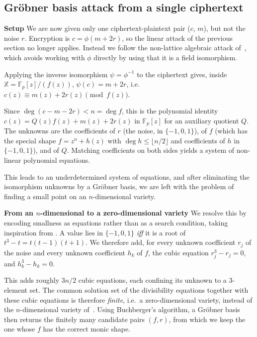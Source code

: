 \documentclass{article}
\begin{document}
\subsection{Gröbner basis attack from a single ciphertext}
\textbf{Setup}
We are now given only one ciphertext-plaintext pair ($c$, $m$), but not the noise $r$. Encryption is $c = \phi(m + 2r)$, so the linear attack of the previous section no longer applies. Instead we follow the non-lattice algebraic attack of~\textcite[\S2.4.2]{doroz2017}, which avoids working with $\phi$ directly
by using that it is a field isomorphism.

Applying the inverse isomorphism $\psi = \phi^{-1}$ to the ciphertext gives, inside $\mathbb{X} = \mathbb{F}_p[z]/(f(z))$, $\psi(c) = m + 2r$, i.e. $c(z) \equiv m(z) + 2r(z) \pmod{f(z)}$.

Since $\deg(c - m - 2r) < n = \deg f$, this is the polynomial identity $c(z) = Q(z)f(z) + m(z) + 2r(z)$ in $\mathbb{F}_p[z]$ for an auxiliary quotient $Q$. The unknowns are the coefficients of $r$ (the noise, in $\{-1,0,1\}$), of $f$ (which has the special shape $f = z^n + h(z)$ with $\deg h \le \lfloor n/2 \rfloor$ and coefficients of $h$ in $\{-1,0,1\}$), and of $Q$. Matching coefficients on both sides yields a system of non-linear polynomial equations.

This leads to an underdetermined system of equations, and after eliminating the isomorphism unknowns by a Gröbner basis, we are left with the problem of finding a small point on an $n$-dimensional variety.

\textbf{From an $n$-dimensional to a zero-dimensional variety}
We resolve this by encoding smallness as equations rather than as a search condition, taking inspiration from \textcite{arora-2011}. A value lies in $\{-1,0,1\}$ \emph{iff} it is a root of $t^3 - t = t(t-1)(t+1)$. We therefore add, for every unknown coefficient
$r_j$ of the noise and every unknown coefficient $h_k$ of $f$, the cubic
equation $r_j^3 - r_j = 0$, and $h_k^3 - h_k = 0$.

This adds roughly $3n/2$ cubic equations, each confining its unknown to a $3$-element set. The common solution set of the divisibility equations together with these cubic equations is therefore \emph{finite}, i.e.\ a zero-dimensional variety, instead of the $n$-dimensional variety of~\textcite{doroz2017}. Using Buchberger's algorithm, a Gröbner basis then returns the finitely many candidate pairs $(f, r)$, from which we keep the one whose $f$ has the correct monic shape.
\end{document}
